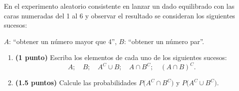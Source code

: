 
En el experimento aleatorio consistente en lanzar un dado equilibrado con las caras numeradas del 1 al 6 y observar el resultado se consideran los siguientes sucesos:

$A$: ``obtener un número mayor que 4'', $B$: ``obtener un número par''.
\begin{enumerate}[label=\alph*)]
\item \textbf{(1 punto)} Escriba los elementos de cada uno de los siguientes sucesos:
\[
A;\quad B;\quad A^C\cup B;\quad A\cap B^C;\quad(A\cap B)^C.
\]
\item \textbf{(1.5 puntos)} Calcule las probabilidades $P\bigl(A^C\cap B^C\bigr)$ y $P\bigl(A^C\cup B^C\bigr)$.
\end{enumerate}
